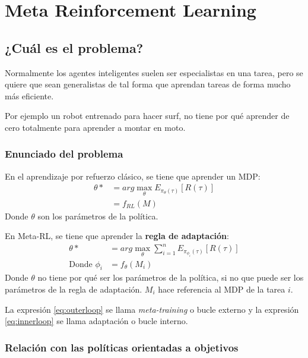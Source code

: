 \chapter{Meta Reinforcement Learning}%
\label{cha:meta_learning}


\section{¿Cuál es el problema?}%
\label{sec:_cuál_es_el_problema_}

Normalmente los agentes inteligentes suelen ser especialistas en una tarea, pero se quiere que
sean generalistas de tal forma que aprendan tareas de forma mucho más eficiente.

Por ejemplo un robot entrenado para hacer surf, no tiene por qué aprender de cero totalmente para
aprender a montar en moto.

\subsection{Enunciado del problema}%
\label{sub:enunciado_del_problema}

En el aprendizaje por refuerzo clásico, se tiene que aprender un MDP:
\begin{align}
    \theta*&=arg\max_\theta E_{\pi_\theta(\tau)}[R(\tau)]\\
           &=f_{RL}(M)
\end{align}
Donde $\theta$ son los parámetros de la política.

En Meta-RL, se tiene que aprender la \textbf{regla de adaptación}:
\begin{align}
    \label{eq:outerloop}
    \theta*&=arg\max_\theta \sum_{i=1}^n E_{\pi_{\phi_i}(\tau)}[R(\tau)]\\
    \label{eq:innerloop}
    \textrm{Donde } \phi_i&=f_\theta(M_i)
\end{align}
Donde $\theta$ no tiene por qué ser los parámetros de la política, si no que puede ser los
parámetros de la regla de adaptación. $M_i$ hace referencia al MDP de la tarea $i$.

La expresión \ref{eq:outerloop} se llama \textit{meta-training} o bucle externo y la
expresión \ref{eq:innerloop} se llama adaptación o bucle interno.

\subsection{Relación con las políticas orientadas a objetivos}%
\label{sub:relación_con_las_políticas_orientadas_a_objetivos}

